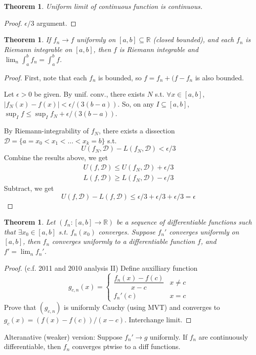 \documentclass{article}
\theoremstyle{definition}
\theoremstyle{remark}
\theoremstyle{plain}
\newtheorem{thm}[defn]{Theorem}
\theoremstyle{definition}
\newcommand{\RR}{\mathbb{R}}
\newcommand{\calD}{\mathcal{D}}
\begin{document}
\begin{thm}
    Uniform limit of continuous function is continuous.
\end{thm}
\begin{proof}
    $\epsilon/3$ argument.
\end{proof}
\begin{thm}
If $f_n\to f$ uniformly on $[a,b]\subseteq\RR$ (closed bounded), and each $f_n$ is Riemann integrable on $[a,b]$, then $f$ is Riemann integrable and $\lim_n\int_a^b f_n=\int_a^b f$.
\end{thm}
\begin{proof}
    First, note that each $f_n$ is bounded, so $f=f_n+(f-f_n$ is also bounded.
    
    Let $\epsilon>0$ be given. By unif. conv., there exists $N$ s.t. $\forall x\in[a,b]$, $|f_N(x)-f(x)|<\epsilon/(3(b-a))$. So, on any $I\subseteq[a,b]$, $\sup_I f\le \sup_If_N+\epsilon/(3(b-a))$.
    
    By Riemann-integrability of $f_N$, there exists a dissection $\calD=\{a=x_0<x_1<\ldots<x_k=b\}$ s.t. 
    \[U(f_N,\calD)-L(f_N,\calD)<\epsilon/3\]
    Combine the results above, we get \begin{align*}
        U(f,\calD)\le U(f_N,\calD)+\epsilon/3\\
        L(f,\calD)\ge L(f_N,\calD)-\epsilon/3
    \end{align*}
    Subtract, we get
    \[U(f,\calD)-L(f,\calD)\le \epsilon/3+\epsilon/3+\epsilon/3=\epsilon\] 
\end{proof}
\begin{thm}
    Let $(f_n:[a,b]\to \RR)$ be a sequence of differentiable functions such that $\exists x_0\in[a,b]$ s.t. $f_n(x_0)$ converges. Suppose $f_n'$ converges uniformly on $[a,b]$, then $f_n$ converges uniformly to a differentiable function $f$, and $f'=\lim_n f_n'$.
\end{thm}
\begin{proof}
(c.f. 2011 and 2010 analysis II) Define auxilliary function 
\[g_{c,n}(x)=\begin{cases}
\dfrac{f_n(x)-f(c)}{x-c}& x\neq c\\
f_n'(c) & x=c
\end{cases}\]
Prove that $(g_{c,n})$ is uniformly Cauchy (using MVT) and converges to $g_c(x)=(f(x)-f(c))/(x-c)$. Interchange limit. 
\end{proof}
    Alteranative (weaker) version: Suppose $f_n'\to g$ uniformly. If $f_n$ are continuously differentiable, then $f_n$ converges ptwise to a diff functions. 
    
\end{document}

